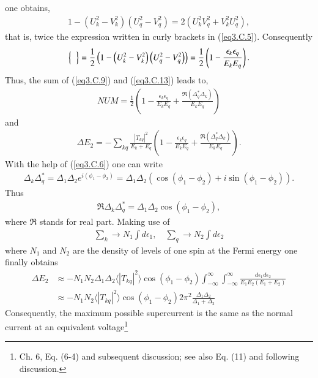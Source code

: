 one obtains,
\begin{align}
1-\left(U_k^2-V_k^2\right)\left(U_q^2-V_q^2\right)=2\left(U_k^2V_q^2+V_k^2U_q^2\right),
\end{align}
that is, twice the expression written in curly brackets in (\ref{eq3.C.5}). Consequently
\begin{align}\label{eq3.C.13}
\left\{\vphantom{\left(U_q^2-V_q^2\right)}\;\;\right\}=\frac{1}{2}\left(1-\left(U_k^2-V_k^2\right)\left(U_q^2-V_q^2\right)\right)=\frac{1}{2}\left(1-\frac{\epsilon_k\epsilon_q}{E_kE_q}\right).
\end{align}
Thus, the sum of (\ref{eq3.C.9}) and (\ref{eq3.C.13}) leads to,
\begin{align}
NUM=\frac{1}{2}\left(1-\frac{\epsilon_k\epsilon_q}{E_kE_q}+\frac{\Re(\Delta_q^*\Delta_k)}{E_kE_q}\right)
\end{align}
and
\begin{align}
\Delta E_2=-\sum_{kq}\frac{|T_{kq}|^2}{E_k+E_q}\left(1-\frac{\epsilon_k\epsilon_q}{E_kE_q}+\frac{\Re(\Delta_q^*\Delta_k)}{E_kE_q}\right).
\end{align}
With the help of (\ref{eq3.C.6}) one can write
\begin{align}
\Delta_k\Delta_q^*=\Delta_1\Delta_2e^{i(\phi_1-\phi_2)}=\Delta_1\Delta_2\left(\cos(\phi_1-\phi_2)+i\sin(\phi_1-\phi_2)\right).
\end{align}
Thus
\begin{align}
\Re\Delta_k\Delta_q^*=\Delta_1\Delta_2\cos(\phi_1-\phi_2),
\end{align}
where $\Re$ stands for real part. Making use of
\begin{align}
\sum_k\rightarrow N_1\int d\epsilon_1,\quad\sum_q\rightarrow N_2\int d\epsilon_2
\end{align}
where $N_1$ and $N_2$ are the density of levels of one spin at the Fermi energy one finally obtains
\begin{align}
\nonumber\Delta E_2&\approx-N_1N_2\Delta_1 \Delta_2 \langle|T_{kq}|^2\rangle \cos(\phi_1-\phi_2)\int_{-\infty}^{\infty}\int_{-\infty}^{\infty}\frac{d\epsilon_1 d\epsilon_2}{E_1 E_2(E_1+E_2)}\\
&\approx -N_1 N_2 \langle|T_{kq}|^2\rangle \cos(\phi_1-\phi_2) 2\pi^2\frac{\Delta_1\Delta_2}{\Delta_1+\Delta_2}
\end{align}
Consequently, the maximum possible supercurrent is the same as the normal current at an equivalent voltage\footnote{\cite{Tinkham:96} Ch. 6, Eq. (6-4) and subsequent discussion; see also \cite{Anderson:64} Eq. (11) and following discussion.}
